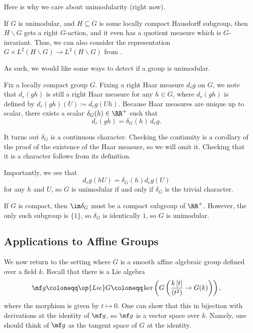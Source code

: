 \documentclass{article}
\begin{document}
Here is why we care about unimodularity (right now).
\begin{example}
	If $G$ is unimodular, and $H\subseteq G$ is some locally compact Hausdorff subgroup, then $H\backslash G$ gets a right $G$-action, and it even has a quotient measure which is $G$-invariant. Thus, we can also consider the representation $G\times L^2(H\backslash G)\to L^2(H\backslash G)$ from .
\end{example}
As such, we would like some ways to detect if a group is unimodular.
\begin{definition}
	Fix a locally compact group $G$. Fixing a right Haar measure $d_rg$ on $G$, we note that $d_r(gh)$ is still a right Haar measure for any $h\in G$, where $d_r(gh)$ is defined by $d_r(gh)(U)\coloneqq d_r g(Uh)$. Because Haar measures are unique up to scalar, there exists a scalar $\delta_G(h)\in\RR^+$ such that
	\[d_r(gh)=\delta_G(h)\,d_rg.\]
\end{definition}
\begin{remark}
	It turns out $\delta_G$ is a continuous character. Checking the continuity is a corollary of the proof of the existence of the Haar measure, so we will omit it. Checking that it is a character follows from its definition.
\end{remark}
\begin{remark}
	Importantly, we see that
	\[d_rg(hU)=\delta_G(h)d_rg(U)\]
	for any $h$ and $U$, so $G$ is unimodular if and only if $\delta_G$ is the trivial character.
\end{remark}
\begin{example}
	If $G$ is compact, then $\im\delta_G$ must be a compact subgroup of $\RR^+$. However, the only such subgroup is $\{1\}$, so $\delta_G$ is identically $1$, so $G$ is unimodular.
\end{example}

\subsection{Applications to Affine Groups}
We now return to the setting where $G$ is a smooth affine algebraic group defined over a field $k$. Recall that there is a Lie algebra
\[\mf g\coloneqq\op{Lie}G\coloneqq\ker\left(G\left(\frac{k\left[t\right]}{\left(t^2\right)}\to G(k)\right)\right),\]
where the morphism is given by $t\mapsto0$. One can show that this in bijection with derivations at the identity of $\mf g$, so $\mf g$ is a vector space over $k$. Namely, one should think of $\mf g$ as the tangent space of $G$ at the identity.
\end{document}
